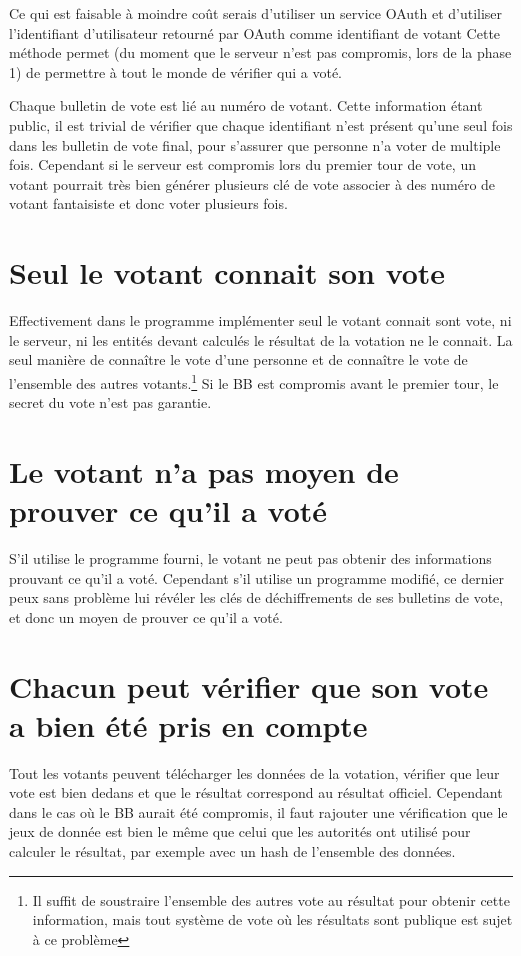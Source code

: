 \documentclass[../report]{subfiles}
\begin{document}
Ce qui est faisable à moindre coût serais d'utiliser un service OAuth et d'utiliser l'identifiant
d'utilisateur retourné par OAuth comme identifiant de votant
Cette méthode permet (du moment que le serveur n'est pas compromis, lors de la phase 1) de permettre
à tout le monde de vérifier qui a voté.

Chaque bulletin de vote est lié au numéro de votant. 
Cette information étant public, il est trivial de vérifier que chaque identifiant n'est présent
qu'une seul fois dans les bulletin de vote final, pour s'assurer que personne n'a voter de 
multiple fois.
Cependant si le serveur est compromis lors du premier tour de vote, un votant pourrait très bien
générer plusieurs clé de vote associer à des numéro de votant fantaisiste et donc voter 
plusieurs fois.

\section{Seul le votant connait son vote}

Effectivement dans le programme implémenter seul le votant connait sont vote, ni le serveur, 
ni les entités devant calculés le résultat de la votation ne le connait.
La seul manière de connaître le vote d'une personne et de connaître le vote de l'ensemble 
des autres votants.\footnote{Il suffit de soustraire l'ensemble des autres vote au résultat
pour obtenir cette information, mais tout système de vote où les résultats sont publique est
sujet à ce problème}
Si le BB est compromis avant le premier tour, le secret du vote n'est pas garantie.

\section{Le votant n'a pas moyen de prouver ce qu'il a voté}

S'il utilise le programme fourni, le votant ne peut pas obtenir des informations prouvant ce qu'il a voté.
Cependant s'il utilise un programme modifié, ce dernier peux sans problème lui révéler les clés de déchiffrements
de ses bulletins de vote, et donc un moyen de prouver ce qu'il a voté.

\section{Chacun peut vérifier que son vote a bien été pris en compte}

Tout les votants peuvent télécharger les données de la votation, vérifier que leur vote est bien dedans et que le résultat 
correspond au résultat officiel.
Cependant dans le cas où le BB aurait été compromis, il faut rajouter une vérification que le jeux de donnée est bien le même que celui
que les autorités ont utilisé pour calculer le résultat, par exemple avec un hash de l'ensemble des données.
\end{document}
